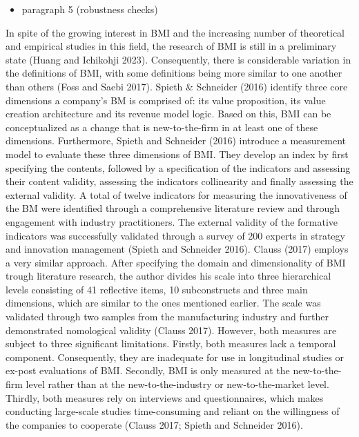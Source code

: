 \documentclass[
]{article}
\providecommand{\tightlist}{%
  \setlength{\itemsep}{0pt}\setlength{\parskip}{0pt}}\usepackage{longtable,booktabs,array}
\begin{document}
\begin{itemize}
\tightlist
\item
  paragraph 5 (robustness checks)
\end{itemize}

In spite of the growing interest in BMI and the increasing number of
theoretical and empirical studies in this field, the research of BMI is
still in a preliminary state (Huang and Ichikohji 2023). Consequently,
there is considerable variation in the definitions of BMI, with some
definitions being more similar to one another than others (Foss and
Saebi 2017). Spieth \& Schneider (2016) identify three core dimensions a
company's BM is comprised of: its value proposition, its value creation
architecture and its revenue model logic. Based on this, BMI can be
conceptualized as a change that is new-to-the-firm in at least one of
these dimensions. Furthermore, Spieth and Schneider (2016) introduce a
measurement model to evaluate these three dimensions of BMI. They
develop an index by first specifying the contents, followed by a
specification of the indicators and assessing their content validity,
assessing the indicators collinearity and finally assessing the external
validity. A total of twelve indicators for measuring the innovativeness
of the BM were identified through a comprehensive literature review and
through engagement with industry practitioners. The external validity of
the formative indicators was successfully validated through a survey of
200 experts in strategy and innovation management (Spieth and Schneider
2016). Clauss (2017) employs a very similar approach. After specifying
the domain and dimensionality of BMI trough literature research, the
author divides his scale into three hierarchical levels consisting of 41
reflective items, 10 subconstructs and three main dimensions, which are
similar to the ones mentioned earlier. The scale was validated through
two samples from the manufacturing industry and further demonstrated
nomological validity (Clauss 2017). However, both measures are subject
to three significant limitations. Firstly, both measures lack a temporal
component. Consequently, they are inadequate for use in longitudinal
studies or ex-post evaluations of BMI. Secondly, BMI is only measured at
the new-to-the-firm level rather than at the new-to-the-industry or
new-to-the-market level. Thirdly, both measures rely on interviews and
questionnaires, which makes conducting large-scale studies
time-consuming and reliant on the willingness of the companies to
cooperate (Clauss 2017; Spieth and Schneider 2016).
\end{document}
